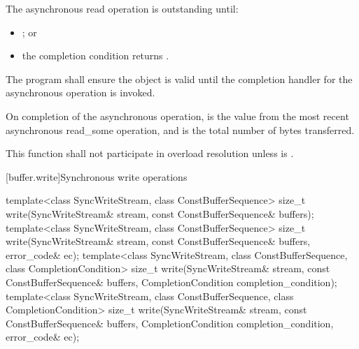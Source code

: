 \begin{itemdescr}
\pnum
 The asynchronous read operation is outstanding until:

\begin{itemize}
\item
{}; or
\item
the completion condition returns .
\end{itemize}

\pnum
The program shall ensure the  object  is valid until the completion handler for the asynchronous operation is invoked.

\pnum
On completion of the asynchronous operation,  is the  value from the most recent asynchronous read_some operation, and  is the total number of bytes transferred.

\pnum
\remarks This function shall not participate in overload resolution unless
\linebreak{} is .
\end{itemdescr}



[buffer.write]{Synchronous write operations}

%
\begin{itemdecl}
template<class SyncWriteStream, class ConstBufferSequence>
  size_t write(SyncWriteStream& stream,
               const ConstBufferSequence& buffers);
template<class SyncWriteStream, class ConstBufferSequence>
  size_t write(SyncWriteStream& stream,
               const ConstBufferSequence& buffers, error_code& ec);
template<class SyncWriteStream, class ConstBufferSequence,
  class CompletionCondition>
    size_t write(SyncWriteStream& stream,
                 const ConstBufferSequence& buffers,
                 CompletionCondition completion_condition);
template<class SyncWriteStream, class ConstBufferSequence,
  class CompletionCondition>
    size_t write(SyncWriteStream& stream,
                 const ConstBufferSequence& buffers,
                 CompletionCondition completion_condition,
                 error_code& ec);
\end{itemdecl}

